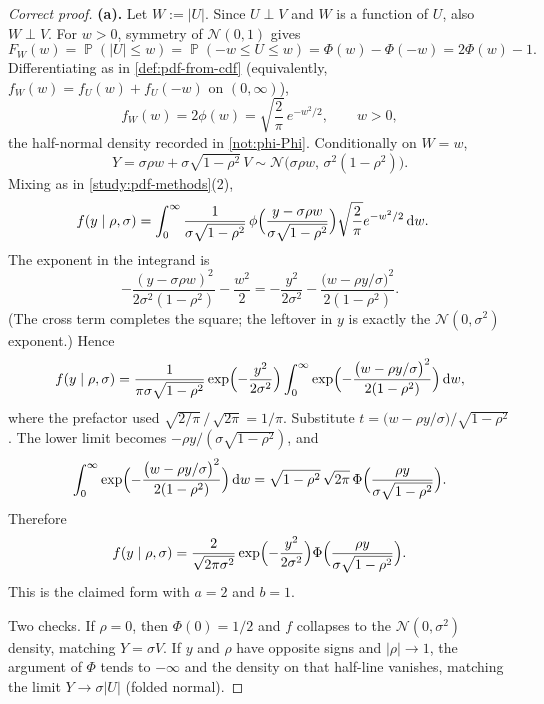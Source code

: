 \documentclass[11pt,a4paper]{article}
\DeclareMathOperator{\Pbb}{\mathbb{P}}
\begin{document}
\begin{proof}[Correct proof]
\textbf{(a).}
Let \(W:=|U|\). Since \(U\perp V\) and \(W\) is a function of \(U\), also \(W\perp V\). For \(w>0\), symmetry of \(\mathcal{N}(0,1)\) gives
\[
F_{W}(w)
=
\Pbb(|U|\le w)
=
\Pbb(-w\le U\le w)
=
\Phi(w)-\Phi(-w)
=
2\Phi(w)-1.
\]
Differentiating as in \cref{def:pdf-from-cdf} (equivalently, \(f_{W}(w)=f_{U}(w)+f_{U}(-w)\) on \((0,\infty)\)),
\[
f_{W}(w)
=
2\phi(w)
=
\sqrt{\frac{2}{\pi}}\,e^{-w^{2}/2},
\qquad w>0,
\]
the half-normal density recorded in \cref{not:phi-Phi}. Conditionally on \(W=w\),
\[
Y
=
\sigma\rho w
+
\sigma\sqrt{1-\rho^{2}}\,V
\sim
\mathcal{N}\bigl(\sigma\rho w,\,\sigma^{2}(1-\rho^{2})\bigr).
\]
Mixing as in \cref{study:pdf-methods}(2),
\begin{align*}
f(y\mid\rho,\sigma)
&=
\int_{0}^{\infty}
\frac{1}{\sigma\sqrt{1-\rho^{2}}}\,
\phi\Bigl(\frac{y-\sigma\rho w}{\sigma\sqrt{1-\rho^{2}}}\Bigr)
\sqrt{\frac{2}{\pi}}
e^{-w^{2}/2}
\,\mathrm{d}w.
\end{align*}
The exponent in the integrand is
\[
-\frac{(y-\sigma\rho w)^{2}}{2\sigma^{2}(1-\rho^{2})}
-
\frac{w^{2}}{2}
=
-\frac{y^{2}}{2\sigma^{2}}
-
\frac{\bigl(w-\rho y/\sigma\bigr)^{2}}{2(1-\rho^{2})}.
\]
(The cross term completes the square; the leftover in \(y\) is exactly the \(\mathcal{N}(0,\sigma^{2})\) exponent.) Hence
\[
f(y\mid\rho,\sigma)
=
\frac{1}{\pi\sigma\sqrt{1-\rho^{2}}}
\exp\Bigl(-\frac{y^{2}}{2\sigma^{2}}\Bigr)
\int_{0}^{\infty}
\exp\Bigl(
-\frac{\bigl(w-\rho y/\sigma\bigr)^{2}}{2(1-\rho^{2})}
\Bigr)
\,\mathrm{d}w,
\]
where the prefactor used \(\sqrt{2/\pi}\,/\,\sqrt{2\pi}=1/\pi\). Substitute \(t=\bigl(w-\rho y/\sigma\bigr)/\sqrt{1-\rho^{2}}\). The lower limit becomes \(-\rho y/(\sigma\sqrt{1-\rho^{2}})\), and
\[
\int_{0}^{\infty}
\exp\Bigl(
-\frac{\bigl(w-\rho y/\sigma\bigr)^{2}}{2(1-\rho^{2})}
\Bigr)
\,\mathrm{d}w
=
\sqrt{1-\rho^{2}}\,\sqrt{2\pi}\,
\Phi\Bigl(\frac{\rho y}{\sigma\sqrt{1-\rho^{2}}}\Bigr).
\]
Therefore
\[
f(y\mid\rho,\sigma)
=
\frac{2}{\sqrt{2\pi\sigma^{2}}}
\exp\Bigl(-\frac{y^{2}}{2\sigma^{2}}\Bigr)
\Phi\Bigl(\frac{\rho y}{\sigma\sqrt{1-\rho^{2}}}\Bigr).
\]
This is the claimed form with \(a=2\) and \(b=1\).

Two checks. If \(\rho=0\), then \(\Phi(0)=1/2\) and \(f\) collapses to the \(\mathcal{N}(0,\sigma^{2})\) density, matching \(Y=\sigma V\). If \(y\) and \(\rho\) have opposite signs and \(|\rho|\to 1\), the argument of \(\Phi\) tends to \(-\infty\) and the density on that half-line vanishes, matching the limit \(Y\to\sigma|U|\) (folded normal).


\end{proof}
\end{document}
